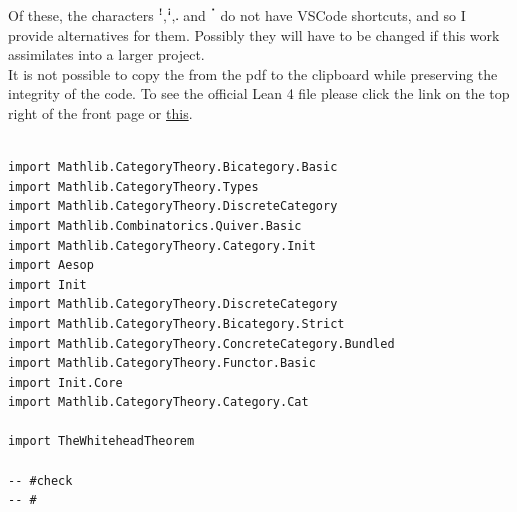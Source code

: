 \documentclass{book}
\theoremstyle{definition}
\newcounter{lcounter}
\begin{document}
Of these, the characters $\texttt{ꜝ,ꜞ,𛲔}$ and $\texttt{ॱ}$ do not have VSCode shortcuts, and so I provide alternatives for them. Possibly they will have to be changed if this work assimilates into a larger project.\\

It is not possible to copy the from the pdf to the clipboard while preserving the integrity of the code. To see the official Lean 4 file please click the link on the top right of the front page or \href{https://github.com/linlib/CategoryTheory/tree/main}{this}.


\begin{center}
\begin{tcolorbox}[width=5in,colback={white},title={\begin{center}\texttt{Lean \thelcounter} \addtocounter{lcounter}{1}  \end{center}},colbacktitle=Blue,coltitle=black]
\begin{verbatim}

import Mathlib.CategoryTheory.Bicategory.Basic
import Mathlib.CategoryTheory.Types 
import Mathlib.CategoryTheory.DiscreteCategory
import Mathlib.Combinatorics.Quiver.Basic
import Mathlib.CategoryTheory.Category.Init
import Aesop
import Init
import Mathlib.CategoryTheory.DiscreteCategory
import Mathlib.CategoryTheory.Bicategory.Strict
import Mathlib.CategoryTheory.ConcreteCategory.Bundled
import Mathlib.CategoryTheory.Functor.Basic
import Init.Core
import Mathlib.CategoryTheory.Category.Cat

import TheWhiteheadTheorem

-- #check 
-- #

\end{verbatim}
\end{tcolorbox}
\end{center}


\newpage
\begin{center}

\pagecolor{white}
\color{black}




\end{center}

\thispagestyle{empty}
\end{document}
